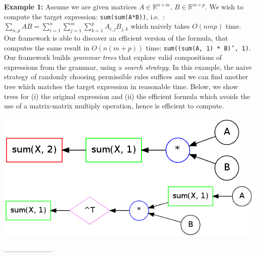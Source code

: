 \documentclass{article} %
\begin{document}
\begin{minipage}{\linewidth}
\begin{framed}
\begin{flushleft}
\vspace{0mm}
{\bf Example 1:} Assume we are given matrices $A \in \mathbb{R}^{n \times m}$, $B \in
\mathbb{R}^{m \times p}$. 
 We wish to compute the target expression: \texttt{sum(sum(A*B))}, i.e.~: 
$\sum_{n,p} AB = \sum_{i = 1}^n \sum_{j = 1}^m \sum_{k = 1}^p A_{i, j} B_{j, k} $
which naively takes $O(nmp)$ time. Our framework is able to discover
an efficient version of the formula, that computes the same result in $O(n(m+p))$
time: {\small \texttt{sum((sum(A, 1) * B)', 1)}}. \\
Our framework builds {\em grammar trees} that explore valid compositions of expressions from the
  grammar, using a {\em search strategy}.  In this example, the naive
  strategy of randomly choosing permissible rules suffices and we can
  find another tree which matches the target expression in reasonable
  time. Below, we show trees for (i) the original expression and (ii) the efficient
formula which avoids the use of a matrix-matrix multiply operation, hence is
efficient to compute.
\vspace{-2mm} 
\begin{center}
\includegraphics[width=0.45\linewidth]{figs/example1_brute.png}
\quad
\quad
\includegraphics[width=0.45\linewidth]{figs/example1_opt.png}
\end{center}
\vspace{-2mm}
\end{flushleft}
\label{fig:example_ab}

\vspace{-3mm}

---------------------


\end{framed}
\end{minipage}
\end{document}
